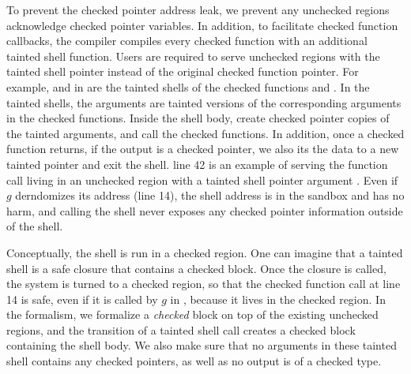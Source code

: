 To prevent the checked pointer address leak,
we prevent any unchecked regions acknowledge checked pointer variables.
In addition, to facilitate checked function callbacks, 
the \systemname compiler compiles every checked function
with an additional tainted shell function.
Users are required to serve unchecked regions with the tainted shell pointer instead of the original checked function pointer.
For example,  and  in  
are the tainted shells of the checked functions  and .
In the tainted shells, the arguments are tainted versions of the corresponding arguments in the checked functions.
Inside the shell body, create checked pointer copies of the tainted arguments, and call the checked functions.
In addition, once a checked function returns,
if the output is a checked pointer, we also its the data to a new tainted pointer and exit the shell.
 line 42 is an example of serving the function call living in an unchecked region
with a tainted shell pointer argument .
Even if $g$ derndomizes its address (line 14), the shell address is in the sandbox and has no harm,
and calling the shell never exposes any checked pointer information outside of the shell.

Conceptually, the shell is run in a checked region.
One can imagine that a tainted shell is a safe closure that contains a checked block.
Once the closure is called, the system is turned to a checked region,
so that the checked function call at  line 14 is safe, 
even if it is called by $g$ in  , because it lives in the checked region.
In the \systemname formalism, we formalize a \textit{checked} block on top of the existing unchecked regions,
and the transition of a tainted shell call creates a checked block containing the shell body.
We also make sure that no arguments in these tainted shell contains any checked pointers,
as well as no output is of a checked type.

  
